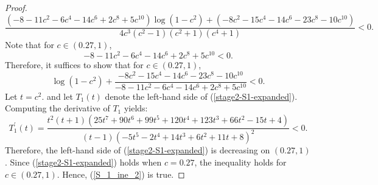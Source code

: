 ﻿\documentclass[10pt]{article}
\begin{document}
\begin{proof}
\begin{equation}
    \frac{(-8-11c^2-6c^4-14c^6+2c^8+5c^{10})\log(1-c^2)+(- 8c^2 - 15c^4 - 14c^6 - 23c^8 - 10c^{10})}{4c^3(c^2 - 1)(c^2 + 1)(c^4 + 1)}<0.
\end{equation}
Note that for $c\in( 0.27, 1)$,
$$-8-11c^2-6c^4-14c^6+2c^8+5c^{10}<0.
$$
Therefore, it suffices to show that for $c\in( 0.27, 1)$,
\begin{equation}
        \log(1-c^2)+\frac{- 8c^2 - 15c^4 - 14c^6 - 23c^8 - 10c^{10}}{-8-11c^2-6c^4-14c^6+2c^8+5c^{10}}<0.
    \label{stage2-S1-expanded}
\end{equation}
Let $t=c^2$. and let $T_{1}(t)$ denote the left-hand side of (\ref{stage2-S1-expanded}). Computing the derivative of $T_{1}$ yields:
$$T_1^{'}(t) = \frac{t^2(t+1)(25t^7 + 90t^6 + 99t^5 + 120t^4 + 123t^3 + 66t^2 - 15t + 4)}{(t - 1)(- 5t^5 - 2t^4 + 14t^3 + 6t^2 + 11t + 8)^2
}<0.
$$
Therefore, the left-hand side of (\ref{stage2-S1-expanded}) is decreasing on $(0.27, 1)$. Since
(\ref{stage2-S1-expanded}) holds when $c=0.27$, the inequality holds for $c\in( 0.27, 1)$. Hence, (\ref{S_1_ine_2}) is true.


\end{proof}
\end{document}
